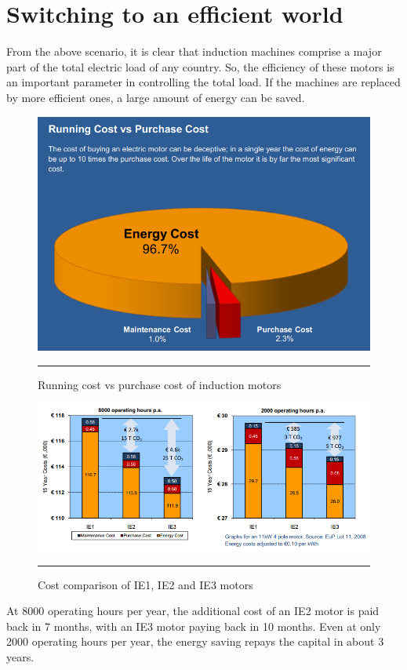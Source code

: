 \section{Switching to an efficient world}
From the above scenario, it is clear that induction machines comprise a major part of the total electric load of any country. So, the efficiency of these motors is an important parameter in controlling the total load. If the machines are replaced by more efficient ones, a large amount of energy can be saved.
\begin{figure}[htbp]
  \centering
    \includegraphics[width = 5in]{./Figures/MS/fig11.png}
    \rule{35em}{1.2pt}
  \caption{Running cost vs purchase cost of induction motors}
  \label{fig:Running cost vs purchase cost of induction motors}
\end{figure}
\begin{figure}[htbp]
  \centering
    \includegraphics[width = 5in]{./Figures/MS/fig12.png}
    \rule{35em}{1.2pt}
  \caption{Cost comparison of IE1, IE2 and IE3 motors}
  \label{fig:Cost comparison of IE1, IE2 and IE3 motors}
\end{figure}
At 8000 operating hours per year, the additional cost of an IE2 motor is paid back in 7 months, with an IE3 motor paying back in 10 months. Even at only 2000 operating hours per year, the energy saving repays the capital in about 3 years.

